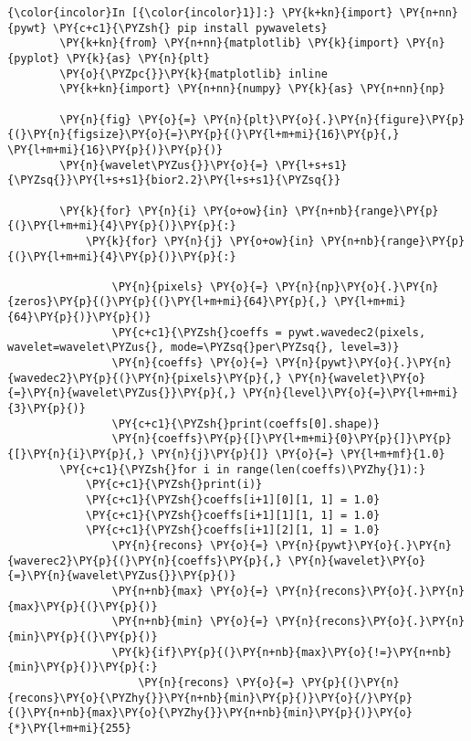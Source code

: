     \begin{Verbatim}[commandchars=\\\{\}]
{\color{incolor}In [{\color{incolor}1}]:} \PY{k+kn}{import} \PY{n+nn}{pywt} \PY{c+c1}{\PYZsh{} pip install pywavelets}
        \PY{k+kn}{from} \PY{n+nn}{matplotlib} \PY{k}{import} \PY{n}{pyplot} \PY{k}{as} \PY{n}{plt}
        \PY{o}{\PYZpc{}}\PY{k}{matplotlib} inline
        \PY{k+kn}{import} \PY{n+nn}{numpy} \PY{k}{as} \PY{n+nn}{np}
        
        \PY{n}{fig} \PY{o}{=} \PY{n}{plt}\PY{o}{.}\PY{n}{figure}\PY{p}{(}\PY{n}{figsize}\PY{o}{=}\PY{p}{(}\PY{l+m+mi}{16}\PY{p}{,} \PY{l+m+mi}{16}\PY{p}{)}\PY{p}{)}
        \PY{n}{wavelet\PYZus{}}\PY{o}{=} \PY{l+s+s1}{\PYZsq{}}\PY{l+s+s1}{bior2.2}\PY{l+s+s1}{\PYZsq{}}
        
        \PY{k}{for} \PY{n}{i} \PY{o+ow}{in} \PY{n+nb}{range}\PY{p}{(}\PY{l+m+mi}{4}\PY{p}{)}\PY{p}{:}
            \PY{k}{for} \PY{n}{j} \PY{o+ow}{in} \PY{n+nb}{range}\PY{p}{(}\PY{l+m+mi}{4}\PY{p}{)}\PY{p}{:}
        
                \PY{n}{pixels} \PY{o}{=} \PY{n}{np}\PY{o}{.}\PY{n}{zeros}\PY{p}{(}\PY{p}{(}\PY{l+m+mi}{64}\PY{p}{,} \PY{l+m+mi}{64}\PY{p}{)}\PY{p}{)}
                \PY{c+c1}{\PYZsh{}coeffs = pywt.wavedec2(pixels, wavelet=wavelet\PYZus{}, mode=\PYZsq{}per\PYZsq{}, level=3)}
                \PY{n}{coeffs} \PY{o}{=} \PY{n}{pywt}\PY{o}{.}\PY{n}{wavedec2}\PY{p}{(}\PY{n}{pixels}\PY{p}{,} \PY{n}{wavelet}\PY{o}{=}\PY{n}{wavelet\PYZus{}}\PY{p}{,} \PY{n}{level}\PY{o}{=}\PY{l+m+mi}{3}\PY{p}{)}
                \PY{c+c1}{\PYZsh{}print(coeffs[0].shape)}
                \PY{n}{coeffs}\PY{p}{[}\PY{l+m+mi}{0}\PY{p}{]}\PY{p}{[}\PY{n}{i}\PY{p}{,} \PY{n}{j}\PY{p}{]} \PY{o}{=} \PY{l+m+mf}{1.0}
        \PY{c+c1}{\PYZsh{}for i in range(len(coeffs)\PYZhy{}1):}
            \PY{c+c1}{\PYZsh{}print(i)}
            \PY{c+c1}{\PYZsh{}coeffs[i+1][0][1, 1] = 1.0}
            \PY{c+c1}{\PYZsh{}coeffs[i+1][1][1, 1] = 1.0}
            \PY{c+c1}{\PYZsh{}coeffs[i+1][2][1, 1] = 1.0}
                \PY{n}{recons} \PY{o}{=} \PY{n}{pywt}\PY{o}{.}\PY{n}{waverec2}\PY{p}{(}\PY{n}{coeffs}\PY{p}{,} \PY{n}{wavelet}\PY{o}{=}\PY{n}{wavelet\PYZus{}}\PY{p}{)}
                \PY{n+nb}{max} \PY{o}{=} \PY{n}{recons}\PY{o}{.}\PY{n}{max}\PY{p}{(}\PY{p}{)}
                \PY{n+nb}{min} \PY{o}{=} \PY{n}{recons}\PY{o}{.}\PY{n}{min}\PY{p}{(}\PY{p}{)}
                \PY{k}{if}\PY{p}{(}\PY{n+nb}{max}\PY{o}{!=}\PY{n+nb}{min}\PY{p}{)}\PY{p}{:}
                    \PY{n}{recons} \PY{o}{=} \PY{p}{(}\PY{n}{recons}\PY{o}{\PYZhy{}}\PY{n+nb}{min}\PY{p}{)}\PY{o}{/}\PY{p}{(}\PY{n+nb}{max}\PY{o}{\PYZhy{}}\PY{n+nb}{min}\PY{p}{)}\PY{o}{*}\PY{l+m+mi}{255}
                    

\end{Verbatim}
